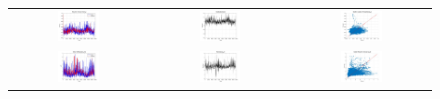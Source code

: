 \begin{figure}[ht!]
  \centering
  \begin{tabular}{ccc}
    \includegraphics[width=0.32\textwidth]{graphs/hybrid/168 hours/mean_fr/actual vs forecast.jpg} &
    \includegraphics[width=0.32\textwidth]{graphs/hybrid/168 hours/mean_fr/residuals.jpg} &
    \includegraphics[width=0.32\textwidth]{graphs/hybrid/168 hours/mean_fr/scatter plot.jpg} \\
    \includegraphics[width=0.32\textwidth]{graphs/hybrid/168 hours/s_wht/actual vs forecast.jpg} &
    \includegraphics[width=0.32\textwidth]{graphs/hybrid/168 hours/s_wht/residuals.jpg} &
    \includegraphics[width=0.32\textwidth]{graphs/hybrid/168 hours/s_wht/scatter plot.jpg} \\

\end{tabular}
\end{figure}
